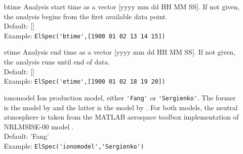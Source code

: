 \documentclass[12pt,a4paper]{report}
\begin{document}
\begin{itemize}
\item[btime] Analysis start time as a vector [yyyy mm dd HH MM SS]. If not given, the analysis begins from the first available data point.\\
Default: []\\
Example: \verb|ElSpec('btime',[1900 01 02 13 14 15])|\\

\item[etime] Analysis end time as a vector [yyyy mm dd HH MM SS]. If not given, the analysis runs until end of data.\\
Default: []\\
Example: \verb|ElSpec('etime',[1900 01 02 18 19 20])|\\

\item[ionomodel] Ion production model, either \verb|'Fang'| or \verb|'Sergienko'|. The former is the model by \cite{fang2010} and the latter is the model by \cite{sergienko1993}. For both models, the neutral atmosphere is taken from the MATLAB aerospace toolbox implementation of NRLMSISE-00 model \citep{picone2002}. \\
Default: 'Fang'\\
Example: \verb|ElSpec('ionomodel','Sergienko')|\\


\end{itemize}
\end{document}
